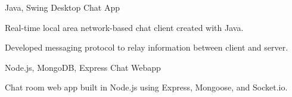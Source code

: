 

\begin{cventries}

  \cventry
  {Java, Swing} %
  {Desktop Chat App} %
  {} %
  {} %
  {
    \begin{cvitems}
      \item {Real-time local area network-based chat client created with Java.}
      \item {Developed messaging protocol to relay information between client and server.}
    \end{cvitems}
  }

  \cventry
  {Node.js, MongoDB, Express}
  {Chat Webapp}
  {} %
  {} %
  {
    \begin{cvitems}
      \item {Chat room web app built in Node.js using Express, Mongoose, and Socket.io.}
    \end{cvitems}
  }

\end{cventries}
